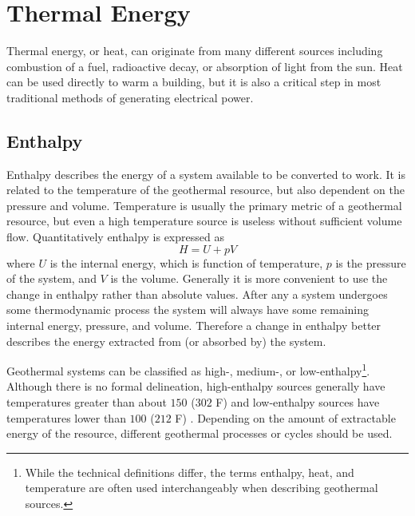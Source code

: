\section{Thermal Energy}
Thermal energy, or heat, can originate from many different sources including combustion of a fuel, radioactive decay, or absorption of light from the sun. Heat can be used directly to warm a building, but it is also a critical step in most traditional methods of generating electrical power. 

\subsection{Enthalpy}
Enthalpy describes the energy of a system available to be converted to work. It is related to the temperature of the geothermal resource, but also dependent on the pressure and volume. Temperature is usually the primary metric of a geothermal resource, but even a high temperature source is useless without sufficient volume flow. Quantitatively enthalpy is expressed as 
\begin{equation}
H = U + pV
\end{equation}
where $U$ is the internal energy, which is function of temperature, $p$ is the pressure of the system, and $V$ is the volume. Generally it is more convenient to use the change in enthalpy rather than absolute values. After any a system undergoes some thermodynamic process the system will always have some remaining internal energy, pressure, and volume. Therefore a change in enthalpy better describes the energy extracted from (or absorbed by) the system.

Geothermal systems can be classified as high-, medium-, or low-enthalpy\footnote{While the technical definitions differ, the terms enthalpy, heat, and temperature are often used interchangeably when describing geothermal sources.}. Although there is no formal delineation, high-enthalpy sources generally have temperatures greater than about $150$ \textcelsius{} ($302$ \textdegree{}F) and low-enthalpy sources have temperatures lower than $100$ \textcelsius{} ($212$ \textdegree{}F) \cite{Norden2011}. Depending on the amount of extractable energy of the resource, different geothermal processes or cycles should be used.

